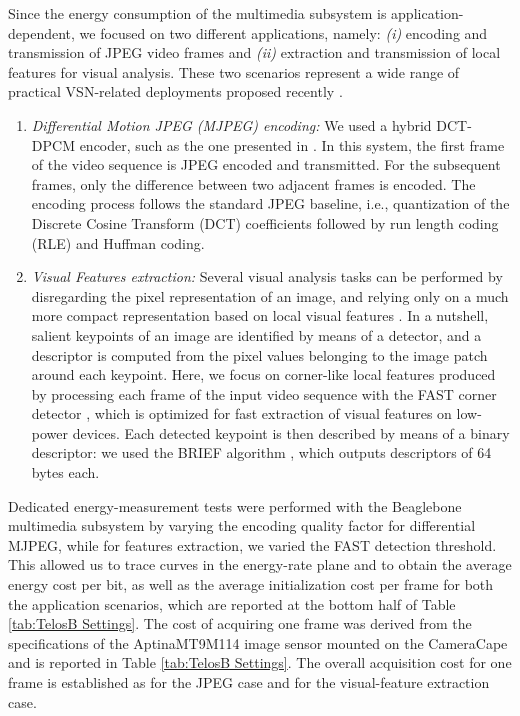 \documentclass[twocolumn,english]{IEEEtran}
\theoremstyle{plain}
\theoremstyle{definition}
\begin{document}
Since the energy consumption of the multimedia subsystem is application-dependent,
we focused on two different applications, namely: \textit{(i)} encoding
and transmission of JPEG video frames and \textit{(ii)} extraction
and transmission of local features for visual analysis. These two
scenarios represent a wide range of practical VSN-related deployments
proposed recently \cite{charfi2009VSN,kwon2009imagesensor,mingorance2010efficient,paniga2011experimental,rahimi2005cyclops,redondi2012rate,yu2004energy,DBLP:conf/MMSP/RedondiBCT}. 

\begin{enumerate}[leftmargin=*] 
\item

\textit{Differential Motion JPEG (MJPEG) encoding:} We used a hybrid
DCT-DPCM encoder, such as the one presented in \cite{paniga2011experimental}.
In this system, the first frame of the video sequence is JPEG encoded
and transmitted. For the subsequent frames, only the difference between
two adjacent frames is encoded. The encoding process follows the standard
JPEG baseline, i.e., quantization of the Discrete Cosine Transform
(DCT) coefficients followed by run length coding (RLE) and Huffman
coding. 

\item

\textit{Visual Features extraction: }Several visual analysis tasks
can be performed by disregarding the pixel representation of an image,
and relying only on a much more compact representation based on local
visual features \cite{DBLP:journals/ijcv/Lowe04}. In a nutshell,
salient keypoints of an image are identified by means of a detector,
and a descriptor is computed from the pixel values belonging to the
image patch around each keypoint. Here, we focus on corner-like local
features produced by processing each frame of the input video sequence
with the FAST corner detector \cite{rosten_2008_faster}, which is
optimized for fast extraction of visual features on low-power devices.
Each detected keypoint is then described by means of a binary descriptor:
we used the BRIEF algorithm \cite{calonder2010brief}, which outputs
descriptors of 64 bytes each. 

\end{enumerate}

Dedicated energy-measurement tests were performed with the Beaglebone
multimedia subsystem by varying the encoding quality factor for differential
MJPEG, while for features extraction, we varied the FAST detection
threshold. This allowed us to trace curves in the energy-rate plane
and to obtain the average energy cost per bit, as well as the average
initialization cost per frame for both the application scenarios,
which are reported at the bottom half of Table \ref{tab:TelosB Settings}.
The cost of acquiring one frame was derived from the specifications
of the AptinaMT9M114 image sensor mounted on the CameraCape and is
reported in Table \ref{tab:TelosB Settings}. The overall acquisition
cost for one frame is established as 
for the JPEG case and  for the
visual-feature extraction case. 
\end{document}
